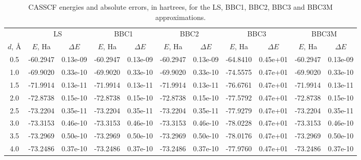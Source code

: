     \begin{table}[b!]
        \scriptsize
        \caption{CASSCF energies and absolute errors, in hartrees, for the LS,
        BBC1, BBC2, BBC3 and BBC3M approximations.}
        \label{tab:energiesCASSCF}
        \centering
        \begin{tabular}{@{}ccccccccccc@{}}
            \toprule
     & \multicolumn{2}{c}{LS} & \multicolumn{2}{c}{BBC1} & \multicolumn{2}{c}{BBC2} & \multicolumn{2}{c}{BBC3} & \multicolumn{2}{c}{BBC3M} \\
     \cmidrule(lr){2-3} \cmidrule(lr){4-5} \cmidrule(lr){6-7} \cmidrule(lr){8-9} \cmidrule(lr){10-11}
            $d$, \AA & $E$, Ha & $\Delta E$ & $E$, Ha & $\Delta E$ & $E$, Ha & $\Delta E$ & $E$, Ha & $\Delta E$ & $E$, Ha & $\Delta E$ \\
            \midrule
            0.5 & -60.2947   & 0.13e-09    & -60.2947     & 0.13e-09      & -60.2947     & 0.13e-09      & -64.8410     & 0.45e+01      & -60.2947     & 0.13e-09     \\
            1.0 & -69.9020   & 0.33e-10    & -69.9020     & 0.33e-10      & -69.9020     & 0.33e-10      & -74.5575     & 0.47e+01      & -69.9020     & 0.33e-10     \\
            1.5 & -71.9914   & 0.13e-11    & -71.9914     & 0.13e-11      & -71.9914     & 0.13e-11      & -76.6761     & 0.47e+01      & -71.9914     & 0.13e-11     \\
            2.0 & -72.8738   & 0.15e-10    & -72.8738     & 0.15e-10      & -72.8738     & 0.15e-10      & -77.5792     & 0.47e+01      & -72.8738     & 0.15e-10     \\
            2.5 & -73.2204   & 0.35e-11    & -73.2204     & 0.35e-11      & -73.2204     & 0.35e-11      & -77.9279     & 0.47e+01      & -73.2204     & 0.35e-11     \\
            3.0 & -73.3153   & 0.46e-10    & -73.3153     & 0.46e-10      & -73.3153     & 0.46e-10      & -78.0228     & 0.47e+01      & -73.3153     & 0.46e-10     \\
            3.5 & -73.2969   & 0.50e-10    & -73.2969     & 0.50e-10      & -73.2969     & 0.50e-10      & -78.0176     & 0.47e+01      & -73.2969     & 0.50e-10     \\
            4.0 & -73.2486   & 0.37e-10    & -73.2486     & 0.37e-10      & -73.2486     & 0.37e-10      & -77.9760     & 0.47e+01      & -73.2486     & 0.37e-10     \\
            \bottomrule
        \end{tabular}
    \end{table}

